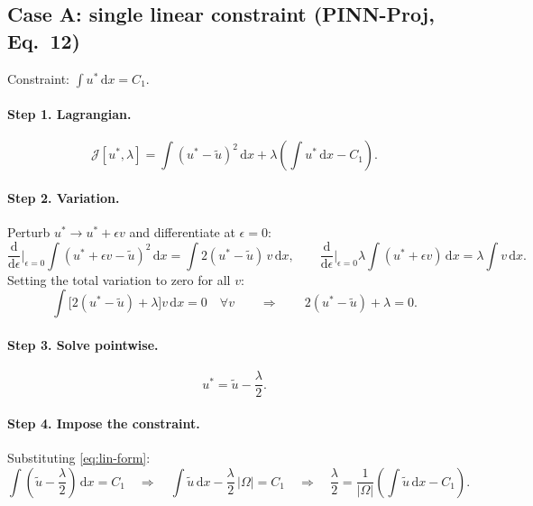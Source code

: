 \documentclass[11pt,a4paper]{article}
\theoremstyle{remark}
\newcommand{\dx}{\,\mathrm{d}x}
\newcommand{\ut}{\tilde{u}}
\newcommand{\us}{u^{*}}
\newcommand{\Om}{\Omega}
\begin{document}
\subsection{Case A: single linear constraint (PINN-Proj, Eq.~12)}

Constraint: $\displaystyle\int \us \dx = C_1$.

\paragraph{Step 1. Lagrangian.}
\begin{equation}
\mathcal{J}[\us,\lambda] = \int (\us-\ut)^2\dx + \lambda\left(\int \us \dx - C_1\right).
\end{equation}

\paragraph{Step 2. Variation.}
Perturb $\us \to \us + \epsilon v$ and differentiate at $\epsilon = 0$:
\begin{equation}
\frac{\mathrm{d}}{\mathrm{d}\epsilon}\bigg|_{\epsilon=0}
\int (\us+\epsilon v-\ut)^2\dx = \int 2(\us-\ut)\,v \dx,
\qquad
\frac{\mathrm{d}}{\mathrm{d}\epsilon}\bigg|_{\epsilon=0}
\lambda\int(\us+\epsilon v)\dx = \lambda\int v\dx .
\end{equation}
Setting the total variation to zero for all $v$:
\begin{equation}
\int\Big[2(\us-\ut) + \lambda\Big]v\dx = 0 \quad \forall v
\qquad\Longrightarrow\qquad
2(\us-\ut) + \lambda = 0 .
\end{equation}

\paragraph{Step 3. Solve pointwise.}
\begin{equation}
\us = \ut - \frac{\lambda}{2}.
\label{eq:lin-form}
\end{equation}

\paragraph{Step 4. Impose the constraint.}
Substituting \eqref{eq:lin-form}:
\begin{equation}
\int\left(\ut - \frac{\lambda}{2}\right)\dx = C_1
\quad\Longrightarrow\quad
\int \ut \dx - \frac{\lambda}{2}\,|\Om| = C_1
\quad\Longrightarrow\quad
\frac{\lambda}{2} = \frac{1}{|\Om|}\left(\int\ut\dx - C_1\right).
\end{equation}
\end{document}
